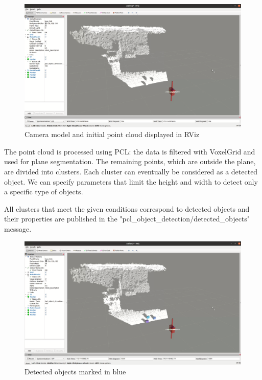 \begin{figure}[h]
    \centering
    \includegraphics[width=0.5\linewidth]{rViz_1.png}
    \caption{Camera model and initial point cloud displayed in RViz}
    \label{fig:enter-label}
\end{figure}

The point cloud is processed using PCL: the data is filtered with VoxelGrid and used for plane segmentation. The remaining points, which are outside the plane, are divided into clusters.
Each cluster can eventually be considered as a detected object. We can specify parameters that limit the height and width to detect only a specific type of objects.\par
All clusters that meet the given conditions correspond to detected objects and their properties are published in the "pcl\_object\_detection/detected\_objects" message.\par


\begin{figure}[h]
    \centering
    \includegraphics[width=0.5\linewidth]{rViz_2.png}
    \caption{Detected objects marked in blue}
    \label{fig:enter-label}
\end{figure}

